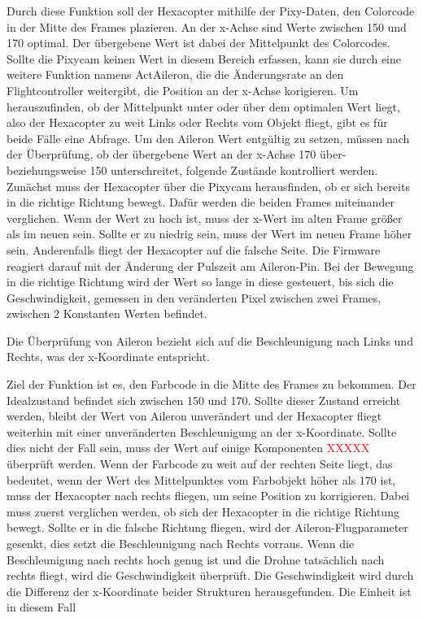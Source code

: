     Durch diese Funktion soll der Hexacopter mithilfe der Pixy-Daten, den Colorcode in der Mitte des Frames plazieren. An der x-Achse sind Werte zwischen 150 und 170 optimal. Der übergebene Wert ist dabei der Mittelpunkt des Colorcodes.
    Sollte die Pixycam keinen Wert in diesem Bereich erfassen, kann sie durch eine weitere Funktion namens ActAileron, die die Änderungsrate an den Flightcontroller weitergibt, die Position an der x-Achse korigieren.
    Um herauszufinden, ob der Mittelpunkt unter oder über dem optimalen Wert liegt, also der Hexacopter zu weit Links oder Rechts vom Objekt fliegt, gibt es für beide Fälle eine Abfrage.
    Um den Aileron Wert entgültig zu setzen, müssen nach der Überprüfung, ob der übergebene Wert an der x-Achse 170 über- beziehungsweise 150 unterschreitet, folgende Zustände kontrolliert werden.
    Zunächst muss der Hexacopter über die Pixycam herausfinden, ob er sich bereits in die richtige Richtung bewegt. Dafür werden die beiden Frames miteinander verglichen. Wenn der Wert zu hoch ist, muss der x-Wert im alten Frame größer als im neuen sein. Sollte er zu niedrig sein, muss der Wert im neuen Frame höher sein.
    Anderenfalls fliegt der Hexacopter auf die falsche Seite. Die Firmware reagiert darauf mit der Änderung der Pulszeit am Aileron-Pin.
    Bei der Bewegung in die richtige Richtung wird der Wert so lange in diese gesteuert, bis sich die Geschwindigkeit, gemessen in den veränderten Pixel zwischen zwei Frames, zwischen 2 Konstanten Werten befindet.


    Die Überprüfung von Aileron bezieht sich auf die Beschleunigung nach Links und Rechts, was der x-Koordinate entspricht.

    Ziel der Funktion ist es, den Farbcode in die Mitte des Frames zu bekommen. Der Idealzustand befindet sich zwischen 150 und 170.
    Sollte dieser Zustand erreicht werden, bleibt der Wert von Aileron unverändert und der Hexacopter fliegt weiterhin mit einer unveränderten Beschleunigung an der x-Koordinate.
    Sollte dies nicht der Fall sein, muss der Wert auf einige Komponenten \textcolor{red}{XXXXX} überprüft werden.
    Wenn der Farbcode zu weit auf der rechten Seite liegt, das bedeutet, wenn der Wert des Mittelpunktes vom Farbobjekt höher als 170 ist,
    muss der Hexacopter nach rechts fliegen, um seine Position zu korrigieren.
    Dabei muss zuerst verglichen werden, ob sich der Hexacopter in die richtige Richtung bewegt. Sollte er in die falsche Richtung
    fliegen, wird der Aileron-Flugparameter gesenkt, dies setzt die Beschleunigung nach Rechts vorraus.
    Wenn die Beschleunigung nach rechts hoch genug ist und die Drohne tatsächlich nach rechts fliegt, wird die Geschwindigkeit überprüft.
    Die Geschwindigkeit wird durch die Differenz der x-Koordinate beider Strukturen herausgefunden. Die Einheit ist in diesem Fall

